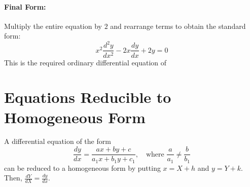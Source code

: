 \documentclass[11pt,a4paper]{article}
\begin{document}
\paragraph{Final Form:}
Multiply the entire equation by $2$ and rearrange terms to obtain the standard form:
\begin{equation}
    x^2\frac{d^2y}{dx^2} - 2x\frac{dy}{dx} + 2y = 0
\end{equation}
This is the required ordinary differential equation of 



\section{Equations Reducible to Homogeneous Form}
A differential equation of the form
\[ \frac{dy}{dx} = \frac{ax+by+c}{a_1x+b_1y+c_1}, \quad \text{where } \frac{a}{a_1} \neq \frac{b}{b_1} \]
can be reduced to a homogeneous form by putting $x = X+h$ and $y = Y+k$. Then, $\frac{dY}{dX} = \frac{dy}{dx}$.
\end{document}
